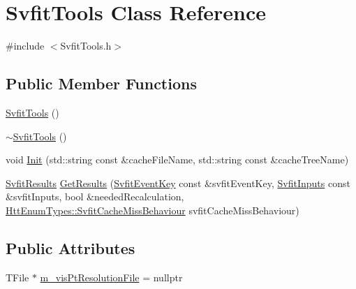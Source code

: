 \hypertarget{classSvfitTools}{
\section{SvfitTools Class Reference}
\label{classSvfitTools}
}


{\ttfamily \#include $<$SvfitTools.h$>$}\subsection*{Public Member Functions}
\begin{DoxyCompactItemize}
\item 
\hyperlink{classSvfitTools_a3ee4e5c67da74ca1da44be0be5e23105}{SvfitTools} ()
\item 
\hyperlink{classSvfitTools_a946db8077e348912ac31945c749efbb0}{$\sim$SvfitTools} ()
\item 
void \hyperlink{classSvfitTools_ab20f7b07a94189526b22b6d8dd8ecfb4}{Init} (std::string const \&cacheFileName, std::string const \&cacheTreeName)
\item 
\hyperlink{classSvfitResults}{SvfitResults} \hyperlink{classSvfitTools_a131289c85e27ee4e9020019ec739c86f}{GetResults} (\hyperlink{classSvfitEventKey}{SvfitEventKey} const \&svfitEventKey, \hyperlink{classSvfitInputs}{SvfitInputs} const \&svfitInputs, bool \&neededRecalculation, \hyperlink{classHttEnumTypes_a51f8f038c31766e1b929398fa2239dcd}{HttEnumTypes::SvfitCacheMissBehaviour} svfitCacheMissBehaviour)
\end{DoxyCompactItemize}
\subsection*{Public Attributes}
\begin{DoxyCompactItemize}
\item 
TFile $\ast$ \hyperlink{classSvfitTools_ae505dd685534e19cf4c4fa662f0e84af}{m\_\-visPtResolutionFile} = nullptr
\end{DoxyCompactItemize}


